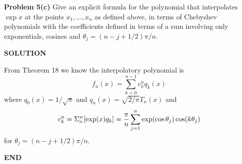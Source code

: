 \documentclass[12pt,a4paper]{article}
\begin{document}
\textbf{Problem 5(c)} Give an explicit formula for the polynomial that interpolates $\exp x$ at the points $x_1,\ensuremath{\ldots},x_n$ as defined above, in terms of Chebyshev polynomials with the coefficients defined in terms of a sum involving only exponentials, cosines and $\ensuremath{\theta}_j = (n-j+1/2)\ensuremath{\pi}/n$.

\textbf{SOLUTION}

From Theorem 18 we know the interpolatory polynomial is 
\[
f_n(x) = \ensuremath{\sum}_{k=0}^{n-1} c_k^n q_k(x)
\]
where $q_0(x) = 1/\sqrt{\ensuremath{\pi}}$ and $q_n(x) = \sqrt{2/\ensuremath{\pi}} T_n(x)$ and
\[
c_k^n = \ensuremath{\Sigma}_n^w[\exp(x) q_k] = {\ensuremath{\pi} \over n} \ensuremath{\sum}_{j=1}^n \exp( \cos \ensuremath{\theta}_j) \cos(k \ensuremath{\theta}_j)
\]
for $\ensuremath{\theta}_j = (n-j+1/2)\ensuremath{\pi}/n$.

\textbf{END}
\end{document}

